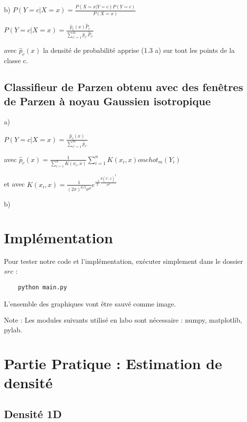 \documentclass[a4paper,10pt]{article}
\begin{document}
b) $P(Y=c | X=x)  = \frac{P(X=x | Y=c) P(Y=c)}{P(X=x)} $

$P(Y=c | X=x)  = \frac{ \hat{p}_{c}(x) \hat{P}_{c}}{ \sum_{c'=1}^{m} \hat{p}_{c'} \hat{P}_{c'} } $

avec $ \hat{p}_{c}(x) $ la densité de probabilité apprise (1.3 a) sur tout les points de la classe c.


\subsection{Classifieur de Parzen obtenu avec des fenêtres de Parzen à noyau Gaussien isotropique}

a)

$P(Y=c | X=x)  = \frac{ \hat{p}_{c}(x) }{ \sum_{c'=1}^{m} \hat{p}_{c'} } $

avec $ \hat{p}_{c}(x) =  \frac{1}{ \sum_{i=1}^{n} K(x_{i}, x) } \sum_{i=1}^{n} K(x_{i}, x) onehot_{m}(Y_{i}) $

et avec $ K(x_{i}, x) = \frac{1}{ (2 \pi)^{d/2} \sigma^{d}}  e^{ \frac{-1}{2} \frac{d(x^{i},x)^{2}}{\sigma^{2}}} $ 


b)

\section{Implémentation}

Pour tester notre code et l'implémentation, exécuter simplement dans le dossier $src$ :
\begin{verbatim}
	python main.py
\end{verbatim}
L'ensemble des graphiques vont être sauvé comme image.

Note : Les modules suivants utilisé en labo sont nécessaire : numpy, matplotlib, pylab.


\section{Partie Pratique : Estimation de densité}

\subsection{Densité 1D}
\end{document}
